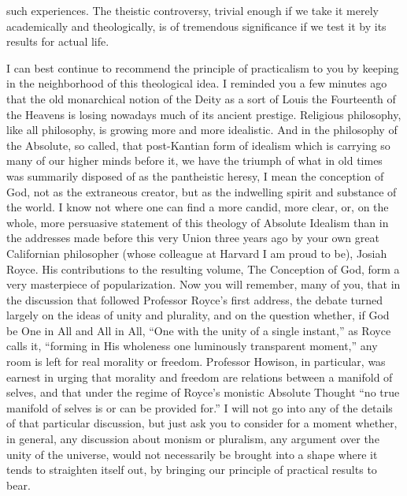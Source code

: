 \documentclass[]{article}
\begin{document}
such experiences. The theistic controversy, trivial enough if we take it merely academically and theologically, is of tremendous significance if we test it by its results for actual life. 

I can best continue to recommend the principle of practicalism to you by keeping in the neighborhood of this theological idea. I reminded you a few minutes ago that the old monarchical notion of the Deity as a sort of Louis the Fourteenth of the Heavens is losing nowadays much of its ancient prestige. Religious philosophy, like all philosophy, is growing more and more idealistic. And in the philosophy of the Absolute, so called, that post-Kantian form of idealism which is carrying so many of our higher minds before it, we have the triumph of what in old times was summarily disposed of as the pantheistic heresy, I mean the conception of God, not as the extraneous creator, but as the indwelling spirit and substance of the world. I know not where one can find a more candid, more clear, or, on the whole, more persuasive statement of this theology of Absolute Idealism than in the addresses made before this very Union three years ago by your own great Californian philosopher (whose colleague at Harvard I am proud to be), Josiah Royce. His contributions to the resulting volume, The Conception of God, form a very masterpiece of popularization. Now you will remember, many of you, that in the discussion that followed Professor Royce's first address, the debate turned largely on the ideas of unity and plurality, and on the question whether, if God be One in All and All in All, ``One with the unity of a single instant,'' as Royce calls it, ``forming in His wholeness one luminously transparent moment,'' any room is left for real morality or freedom. Professor Howison, in particular, was earnest in urging that morality and freedom are relations between a manifold of selves, and that under the regime of Royce's monistic Absolute Thought ``no true manifold of selves is or can be provided for.'' I will not go into any of the details of that particular discussion, but just ask you to consider for a moment whether, in general, any discussion about monism or pluralism, any argument over the unity of the universe, would not necessarily be brought into a shape where it tends to straighten itself out, by bringing our principle of practical results to bear. 
\end{document}
